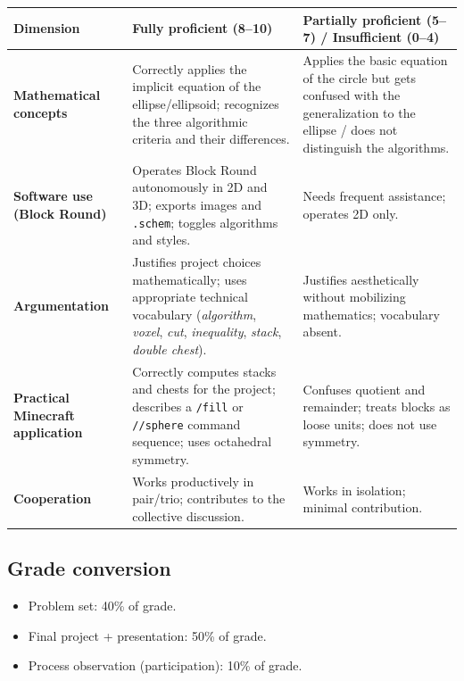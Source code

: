 \documentclass[12pt,a4paper]{scrartcl}
\newcommand{\cmd}[1]{\textcolor{earth}{\texttt{\small #1}}}
\begin{document}
\begin{center}
\small
\begin{tabularx}{\textwidth}{@{}p{}XX@{}}
\toprule
\textbf{Dimension} & \textbf{Fully proficient (8--10)} & \textbf{Partially proficient (5--7) / Insufficient (0--4)} \\
\midrule
\textbf{Mathematical concepts} & Correctly applies the implicit equation of the ellipse/ellipsoid; recognizes the three algorithmic criteria and their differences. & Applies the basic equation of the circle but gets confused with the generalization to the ellipse / does not distinguish the algorithms. \\
\addlinespace[3pt]
\textbf{Software use (Block Round)} & Operates Block Round autonomously in 2D and 3D; exports images and \texttt{.schem}; toggles algorithms and styles. & Needs frequent assistance; operates 2D only. \\
\addlinespace[3pt]
\textbf{Argumentation} & Justifies project choices mathematically; uses appropriate technical vocabulary (\emph{algorithm}, \emph{voxel}, \emph{cut}, \emph{inequality}, \emph{stack}, \emph{double chest}). & Justifies aesthetically without mobilizing mathematics; vocabulary absent. \\
\addlinespace[3pt]
\textbf{Practical Minecraft application} & Correctly computes stacks and chests for the project; describes a \cmd{/fill} or \cmd{//sphere} command sequence; uses octahedral symmetry. & Confuses quotient and remainder; treats blocks as loose units; does not use symmetry. \\
\addlinespace[3pt]
\textbf{Cooperation} & Works productively in pair/trio; contributes to the collective discussion. & Works in isolation; minimal contribution. \\
\bottomrule
\end{tabularx}
\end{center}

\subsection{Grade conversion}
\begin{itemize}[leftmargin=1.3em,itemsep=0.1em,topsep=0.2em,nosep]
  \item Problem set: 40\% of grade.
  \item Final project + presentation: 50\% of grade.
  \item Process observation (participation): 10\% of grade.
\end{itemize}
\end{document}
